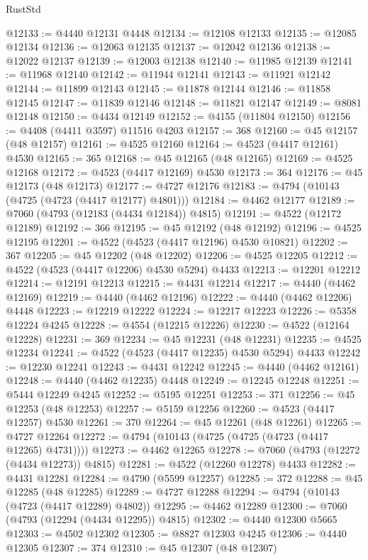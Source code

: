 \begin{lexlean}{RustStd}
\begin{coremodule}
@12133 := @4440 @12131 @4448
@12134 := @12108 @12133
@12135 := @12085 @12134
@12136 := @12063 @12135
@12137 := @12042 @12136
@12138 := @12022 @12137
@12139 := @12003 @12138
@12140 := @11985 @12139
@12141 := @11968 @12140
@12142 := @11944 @12141
@12143 := @11921 @12142
@12144 := @11899 @12143
@12145 := @11878 @12144
@12146 := @11858 @12145
@12147 := @11839 @12146
@12148 := @11821 @12147
@12149 := @8081 @12148
@12150 := @4434 @12149
@12152 := @4155 (@11804 @12150)
@12156 := @4408 (@4411 @3597) @11516 @4203
@12157 := 368
@12160 := @45 @12157 (@48 @12157)
@12161 := @4525 @12160
@12164 := @4523 (@4417 @12161) @4530
@12165 := 365
@12168 := @45 @12165 (@48 @12165)
@12169 := @4525 @12168
@12172 := @4523 (@4417 @12169) @4530
@12173 := 364
@12176 := @45 @12173 (@48 @12173)
@12177 := @4727 @12176
@12183 := @4794 (@10143 (@4725 (@4723 (@4417 @12177) @4801)))
@12184 := @4462 @12177
@12189 := @7060 (@4793 (@12183 (@4434 @12184)) @4815)
@12191 := @4522 (@12172 @12189)
@12192 := 366
@12195 := @45 @12192 (@48 @12192)
@12196 := @4525 @12195
@12201 := @4522 (@4523 (@4417 @12196) @4530 @10821)
@12202 := 367
@12205 := @45 @12202 (@48 @12202)
@12206 := @4525 @12205
@12212 := @4522 (@4523 (@4417 @12206) @4530 @5294) @4433
@12213 := @12201 @12212
@12214 := @12191 @12213
@12215 := @4431 @12214
@12217 := @4440 (@4462 @12169)
@12219 := @4440 (@4462 @12196)
@12222 := @4440 (@4462 @12206) @4448
@12223 := @12219 @12222
@12224 := @12217 @12223
@12226 := @5358 @12224 @4245
@12228 := @4554 (@12215 @12226)
@12230 := @4522 (@12164 @12228)
@12231 := 369
@12234 := @45 @12231 (@48 @12231)
@12235 := @4525 @12234
@12241 := @4522 (@4523 (@4417 @12235) @4530 @5294) @4433
@12242 := @12230 @12241
@12243 := @4431 @12242
@12245 := @4440 (@4462 @12161)
@12248 := @4440 (@4462 @12235) @4448
@12249 := @12245 @12248
@12251 := @5444 @12249 @4245
@12252 := @5195 @12251
@12253 := 371
@12256 := @45 @12253 (@48 @12253)
@12257 := @5159 @12256
@12260 := @4523 (@4417 @12257) @4530
@12261 := 370
@12264 := @45 @12261 (@48 @12261)
@12265 := @4727 @12264
@12272 := @4794 (@10143 (@4725 (@4725 (@4723 (@4417 @12265) @4731))))
@12273 := @4462 @12265
@12278 := @7060 (@4793 (@12272 (@4434 @12273)) @4815)
@12281 := @4522 (@12260 @12278) @4433
@12282 := @4431 @12281
@12284 := @4790 (@5599 @12257)
@12285 := 372
@12288 := @45 @12285 (@48 @12285)
@12289 := @4727 @12288
@12294 := @4794 (@10143 (@4723 (@4417 @12289) @4802))
@12295 := @4462 @12289
@12300 := @7060 (@4793 (@12294 (@4434 @12295)) @4815)
@12302 := @4440 @12300 @5665
@12303 := @4502 @12302
@12305 := @8827 @12303 @4245
@12306 := @4440 @12305
@12307 := 374
@12310 := @45 @12307 (@48 @12307)

\end{coremodule}
\end{lexlean}
